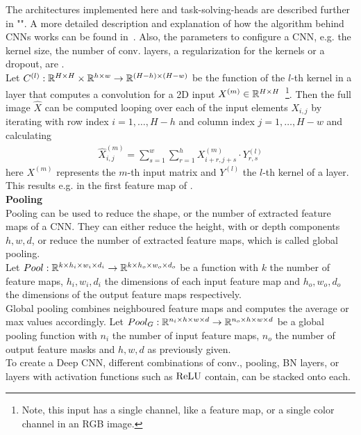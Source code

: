 The architectures implemented here and task-solving-heads are described further in "".
A more detailed description and explanation of how the algorithm behind CNNs works can be found in~\cite{lecun-bengio}.
Also, the parameters to configure a CNN, e.g. the kernel size, the number of conv. layers, a regularization for the kernels or a dropout, are .\\
Let $C^{(l)}: \mathbb{R}^{H\times H}\times \mathbb{R}^{h\times w} \rightarrow \mathbb{R}^{(H-h)\times (H-w)}$ be the function of the $l$-th kernel in a layer that computes a convolution for a 2D input $X^{(m)}\in\mathbb{R}^{H\times H}$~\footnote{
    Note, this input has a single channel, like a feature map, or a single color channel in an RGB image.
}.
Then the full image $\hat{X}$ can be computed looping over each of the input elements $X_{i,j}$ by iterating with row index $i=1,\ldots, H-h$ and column index $j=1,\ldots, H-w$ and calculating
\begin{align}
    \hat{X}_{i,j}^{(m)} =
    \sum\limits_{s=1}^w
    \sum\limits_{r=1}^h
    X^{(m)}_{i+r, j+s}\cdot Y^{(l)}_{r,s}
\end{align}
here $X^{(m)}$ represents the $m$-th input matrix and $Y^{(l)}$ the $l$-th kernel of a layer.
This results e.g. in the first feature map of .\\
\textbf{Pooling}\\
Pooling can be used to reduce the shape, or the number of extracted feature maps of a CNN.
They can either reduce the height, with or depth components $h, w, d$, or reduce the number of extracted feature maps, which is called global pooling.\\
Let $Pool: \mathbb{R}^{k\times h_i\times w_i\times d_i}\rightarrow \mathbb{R}^{k\times h_o\times w_o\times d_o}$
be a function with $k$ the number of feature maps, $h_i, w_i, d_i$ the dimensions of each input feature map and $h_o, w_o, d_o$ the dimensions of the output feature maps respectively.\\
Global pooling combines neighboured feature maps and computes the average or max values accordingly.\newline
Let $Pool_G: \mathbb{R}^{n_i\times h\times w\times d} \rightarrow \mathbb{R}^{n_o\times h\times w\times d}$ be a global pooling function with $n_i$ the number of input feature maps, $n_o$ the number of output feature masks and $h,w,d$ as previously given.\\
To create a Deep CNN, different combinations of conv., pooling, BN layers, or layers with activation functions such as $\operatorname{ReLU}$ contain, can be stacked onto each.

